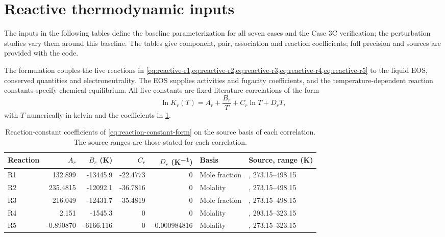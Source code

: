 \section{Reactive thermodynamic inputs}\label{sec:selected-reactive-inputs}
The inputs in the following tables define the baseline parameterization for all seven cases and the Case 3C verification; the perturbation studies vary them around this baseline.
The tables give component, pair, association and reaction coefficients; full precision and sources are provided with the code.



The formulation couples the five reactions in \cref{eq:reactive-r1,eq:reactive-r2,eq:reactive-r3,eq:reactive-r4,eq:reactive-r5} to the liquid EOS, conserved quantities and electroneutrality.
The EOS supplies activities and fugacity coefficients, and the temperature-dependent reaction constants specify chemical equilibrium.
All five constants are fixed literature correlations of the form
\begin{equation}
\ln K_r(T)=A_r+\frac{B_r}{T}+C_r\ln T+D_rT,\label{eq:reaction-constant-form}
\end{equation}
with $T$ numerically in kelvin and the coefficients in \cref{tab:reaction-constant-coefficients}.
\begin{table}[pos=htbp]
\centering\small\setlength{\tabcolsep}{4pt}
\caption{Reaction-constant coefficients of \cref{eq:reaction-constant-form} on the source basis of each correlation. The source ranges are those stated for each correlation.}
\label{tab:reaction-constant-coefficients}
\begin{tabular}{@{}lrrrrll@{}}
\toprule
Reaction & $A_r$ & $B_r$ (\unit{K}) & $C_r$ & $D_r$ (\unit{K^{-1}}) & Basis & Source, range (\unit{K}) \\
\midrule
R1 & 132.899 & -13445.9 & -22.4773 & 0 & Mole fraction & \cite{Austgen1991}, 273.15--498.15 \\
R2 & 235.4815 & -12092.1 & -36.7816 & 0 & Molality & \cite{Austgen1991}, 273.15--498.15 \\
R3 & 216.049 & -12431.7 & -35.4819 & 0 & Mole fraction & \cite{Austgen1991}, 273.15--498.15 \\
R4 & 2.151 & -1545.3 & 0 & 0 & Molality & \cite{Tong2012}, 293.15--323.15 \\
R5 & -0.890870 & -6166.116 & 0 & -0.000984816 & Molality & \cite{batesAcidicDissociationConstant1951}, 273.15--323.15 \\
\bottomrule
\end{tabular}
\end{table}
